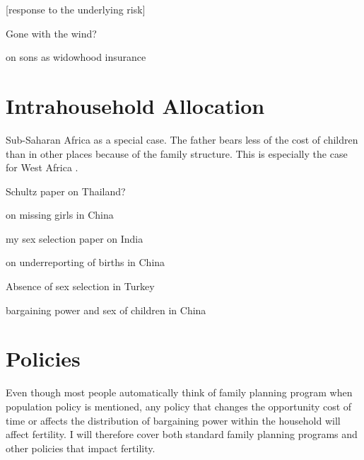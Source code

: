 \documentclass[letterpaper,12pt]{article}
\begin{document}
[response to the underlying risk]

Gone with the wind?

\citep{Lambert2016} on sons as widowhood insurance 

\citep{Adsera2011}


\section{Intrahousehold Allocation}

Sub-Saharan Africa as a special case.
The father bears less of the cost of children than
in other places because of the family structure.
This is especially the case for West Africa \citep{Caldwell1992}.

Schultz paper on Thailand?

\citet{Ashraf2014}

\cite{merli00} on missing girls in China

\citep{Rasul2008}

\citep{Field2016}

my sex selection paper on India

\citet{merli00} on underreporting of births in China

Absence of sex selection in Turkey
\citet{Altindag2016}

bargaining power and sex of children in China \citet{Li2011}


\section{Policies}

Even though most people automatically think of family planning
program when population policy is mentioned, any policy that changes 
the opportunity cost of time or affects the distribution of
bargaining power within the household will affect fertility.
I will therefore cover both standard family planning programs
and other policies that impact fertility.

\end{document}
